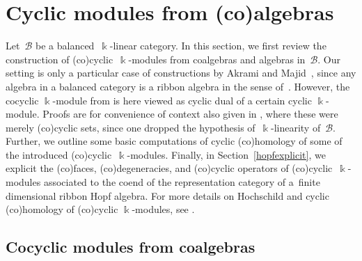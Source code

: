 \documentclass[10pt,a4paper]{amsart}
\numberwithin{equation}{section}
\newcommand{\mc}{\mathcal}
\newcommand{\kk}{\Bbbk}
\begin{document}
\section{Cyclic modules from (co)algebras} \label{algebraiccyclic}



Let~$\mc B$ be a balanced~$\kk$-linear category. In this section, we first review the construction of (co)cyclic~$\kk$-modules from coalgebras and algebras in~$\mc B$. Our setting is only a particular case of constructions by Akrami and Majid~\cite{cycliccocycles}, since any algebra in a balanced category is a ribbon algebra in the sense of~\cite{cycliccocycles}. However, the cocyclic $\kk$-module from \cite{cycliccocycles} is here viewed as cyclic dual of a certain cyclic $\kk$-module.
Proofs are for convenience of context also given in \cite{bartulovic2022cyclicsetsribbonstring}, where these were merely (co)cyclic sets, since one dropped the hypothesis of~$\kk$-linearity of~$\mc B$. Further, we outline some basic computations of cyclic (co)homology of some of the introduced (co)cyclic~$\kk$-modules.
Finally, in Section~\ref{hopfexplicit}, we explicit the (co)faces, (co)degeneracies, and (co)cyclic operators of (co)cyclic~$\kk$-modules associated to the coend of the representation category of a~finite dimensional ribbon Hopf algebra. For more details on Hochschild and cyclic (co)homology of (co)cyclic $\kk$-modules, see \cite[Section~9.6]{weibel}.

\subsection{Cocyclic modules from coalgebras} \label{objetdedebut}
\end{document}
